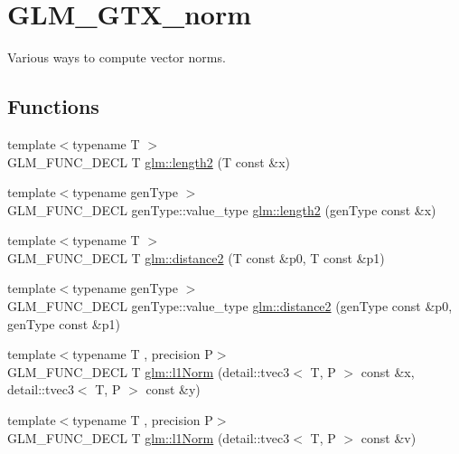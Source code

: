 \hypertarget{group__gtx__norm}{}\section{G\+L\+M\+\_\+\+G\+T\+X\+\_\+norm}
\label{group__gtx__norm}


Various ways to compute vector norms.  


\subsection*{Functions}
\begin{DoxyCompactItemize}
\item 
{\footnotesize template$<$typename T $>$ }\\G\+L\+M\+\_\+\+F\+U\+N\+C\+\_\+\+D\+E\+CL T \hyperlink{group__gtx__norm_ga08c670024cd230e22f8b853f185ff533}{glm\+::length2} (T const \&x)
\item 
{\footnotesize template$<$typename gen\+Type $>$ }\\G\+L\+M\+\_\+\+F\+U\+N\+C\+\_\+\+D\+E\+CL gen\+Type\+::value\+\_\+type \hyperlink{group__gtx__norm_gaa279ba7fdecbed3f9f2b60502b7ec8ca}{glm\+::length2} (gen\+Type const \&x)
\item 
{\footnotesize template$<$typename T $>$ }\\G\+L\+M\+\_\+\+F\+U\+N\+C\+\_\+\+D\+E\+CL T \hyperlink{group__gtx__norm_ga3544f6288d3bce2cf2a9f6ebe39e0557}{glm\+::distance2} (T const \&p0, T const \&p1)
\item 
{\footnotesize template$<$typename gen\+Type $>$ }\\G\+L\+M\+\_\+\+F\+U\+N\+C\+\_\+\+D\+E\+CL gen\+Type\+::value\+\_\+type \hyperlink{group__gtx__norm_gaec2d9df62436879b48207d39516f3788}{glm\+::distance2} (gen\+Type const \&p0, gen\+Type const \&p1)
\item 
{\footnotesize template$<$typename T , precision P$>$ }\\G\+L\+M\+\_\+\+F\+U\+N\+C\+\_\+\+D\+E\+CL T \hyperlink{group__gtx__norm_gae7c48d18df3e4a9c13bb9c003e434d5f}{glm\+::l1\+Norm} (detail\+::tvec3$<$ T, P $>$ const \&x, detail\+::tvec3$<$ T, P $>$ const \&y)
\item 
{\footnotesize template$<$typename T , precision P$>$ }\\G\+L\+M\+\_\+\+F\+U\+N\+C\+\_\+\+D\+E\+CL T \hyperlink{group__gtx__norm_ga466d01e7b4350f44250d80ec48128fbd}{glm\+::l1\+Norm} (detail\+::tvec3$<$ T, P $>$ const \&v)
\item 

\end{DoxyCompactItemize}
